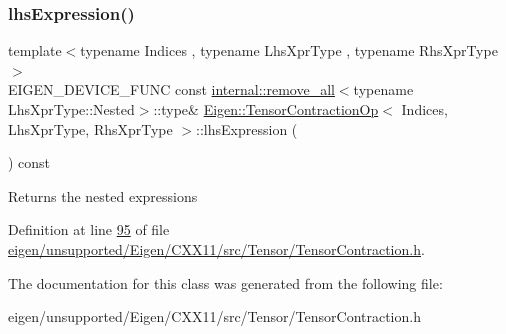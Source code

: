 \mbox{\label{class_eigen_1_1_tensor_contraction_op_a1e3bb92babac5554f7164b12e9654daa}} 
\subsubsection{\texorpdfstring{lhs\+Expression()}{lhsExpression()}\hspace{0.1cm}{\footnotesize\ttfamily [2/2]}}
{\footnotesize\ttfamily template$<$typename Indices , typename Lhs\+Xpr\+Type , typename Rhs\+Xpr\+Type $>$ \\
E\+I\+G\+E\+N\+\_\+\+D\+E\+V\+I\+C\+E\+\_\+\+F\+U\+NC const \hyperlink{struct_eigen_1_1internal_1_1remove__all}{internal\+::remove\+\_\+all}$<$typename Lhs\+Xpr\+Type\+::\+Nested$>$\+::type\& \hyperlink{class_eigen_1_1_tensor_contraction_op}{Eigen\+::\+Tensor\+Contraction\+Op}$<$ Indices, Lhs\+Xpr\+Type, Rhs\+Xpr\+Type $>$\+::lhs\+Expression (\begin{DoxyParamCaption}{ }\end{DoxyParamCaption}) const\hspace{0.3cm}{\ttfamily [inline]}}

\begin{DoxyReturn}{Returns}
the nested expressions 
\end{DoxyReturn}


Definition at line \hyperlink{eigen_2unsupported_2_eigen_2_c_x_x11_2src_2_tensor_2_tensor_contraction_8h_source_l00095}{95} of file \hyperlink{eigen_2unsupported_2_eigen_2_c_x_x11_2src_2_tensor_2_tensor_contraction_8h_source}{eigen/unsupported/\+Eigen/\+C\+X\+X11/src/\+Tensor/\+Tensor\+Contraction.\+h}.



The documentation for this class was generated from the following file\+:\begin{DoxyCompactItemize}
\item 
eigen/unsupported/\+Eigen/\+C\+X\+X11/src/\+Tensor/\+Tensor\+Contraction.\+h\end{DoxyCompactItemize}
